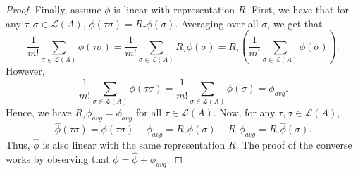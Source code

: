 \documentclass[10pt,letterpaper]{article}
\newcommand{\calL}{{\mathcal{L}}}
\newcommand{\rank}{{\calL(A)}}
\DeclareMathOperator*{\argmin}{arg\,min}
\begin{document}
\begin{proof}
Finally, assume $\phi$ is linear with representation $R$. First, we have that for any $\tau,\sigma \in \rank$, $\phi(\tau \sigma) = R_{\tau}\phi(\sigma)$. Averaging over all $\sigma$, we get that 
$$
\frac{1}{m!} \sum_{\sigma \in \rank} \phi(\tau \sigma) = \frac{1}{m!}  \sum_{\sigma \in \rank} R_{\tau} \phi(\sigma) = R_{\tau} \left (\frac{1}{m!}  \sum_{\sigma \in \rank} \phi(\sigma) \right).
$$
However, 
$$
\frac{1}{m!}  \sum_{\sigma \in \rank} \phi(\tau \sigma) = \frac{1}{m!}  \sum_{\sigma \in \rank} \phi(\sigma) = \phi_{avg}.
$$
Hence, we have $R_{\tau}\phi_{avg} = \phi_{avg}$ for all $\tau \in \rank$. Now, for any $\tau,\sigma \in \rank$, 
$$
\hat{\phi}(\tau \sigma) = \phi(\tau \sigma) - \phi_{avg} = R_{\tau}\phi(\sigma) - R_{\tau}\phi_{avg} = R_{\tau}\hat{\phi}(\sigma).
$$
Thus, $\hat{\phi}$ is also linear with the same representation $R$. The proof of the converse works by observing that $\phi = \hat{\phi}+\phi_{avg}$. 
%
%
\end{proof}
\end{document}
